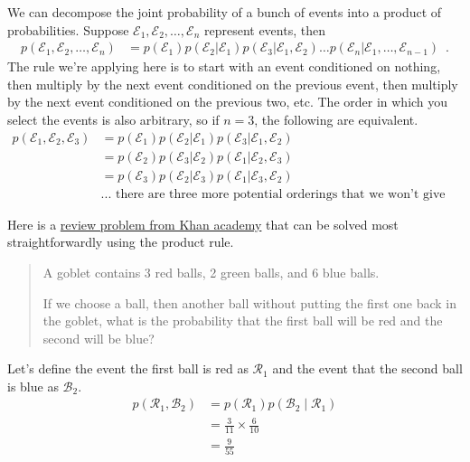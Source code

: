 \documentclass[review_Solutions]{subfiles}
\begin{document}
We can decompose the joint probability of a bunch of events into a product of probabilities.  Suppose $\mathcal{E}_1, \mathcal{E}_2, \ldots, \mathcal{E}_n$ represent events, then
\begin{align}
p(\mathcal{E}_1, \mathcal{E}_2, \ldots, \mathcal{E}_n) &= p(\mathcal{E}_1) p(\mathcal{E}_2 | \mathcal{E}_1) p(\mathcal{E}_3 | \mathcal{E}_1, \mathcal{E}_2) \ldots p(\mathcal{E}_n | \mathcal{E}_1, \ldots, \mathcal{E}_{n-1}) \enspace .
\end{align}
The rule we're applying here is to start with an event conditioned on nothing, then multiply by the next event conditioned on the previous event, then multiply by the next event conditioned on the previous two, etc.  The order in which you select the events is also arbitrary, so if $n=3$, the following are equivalent.
\begin{align}
p(\mathcal{E}_1, \mathcal{E}_2, \mathcal{E}_3) &= p(\mathcal{E}_1) p(\mathcal{E}_2|\mathcal{E}_1)p(\mathcal{E}_3|\mathcal{E}_1, \mathcal{E}_2) \nonumber \\
&= p(\mathcal{E}_2) p(\mathcal{E}_3|\mathcal{E}_2)p(\mathcal{E}_1|\mathcal{E}_2, \mathcal{E}_3) \nonumber \\
&= p(\mathcal{E}_3) p(\mathcal{E}_2|\mathcal{E}_3)p(\mathcal{E}_1|\mathcal{E}_3, \mathcal{E}_2) \nonumber \\
&\mbox{... there are three more potential orderings that we won't give explicitly} \nonumber
\end{align}

\begin{exercise}
Here is a \href{https://www.khanacademy.org/math/ap-statistics/probability-ap/probability-multiplication-rule/e/dependent\_probability}{review problem from Khan academy} that can be solved most straightforwardly using the product rule.

\begin{quote}
A goblet contains 3 red balls, 2 green balls, and 6 blue balls.

If we choose a ball, then another ball without putting the first one back in the goblet, what is the probability that the first ball will be red and the second will be blue?
\end{quote}
\begin{boxedsolution}
Let's define the event the first ball is red as $\mathcal{R}_1$ and the event that the second ball is blue as $\mathcal{B}_2$.
\begin{align}
p(\mathcal{R}_1, \mathcal{B}_2) &= p(\mathcal{R}_1) p(\mathcal{B}_2 \mid \mathcal{R}_1) \nonumber \\
&= \frac{3}{11} \times \frac{6}{10} \nonumber \\
&= \frac{9}{55} \nonumber
\end{align}
\end{boxedsolution}
\end{exercise}
\end{document}
